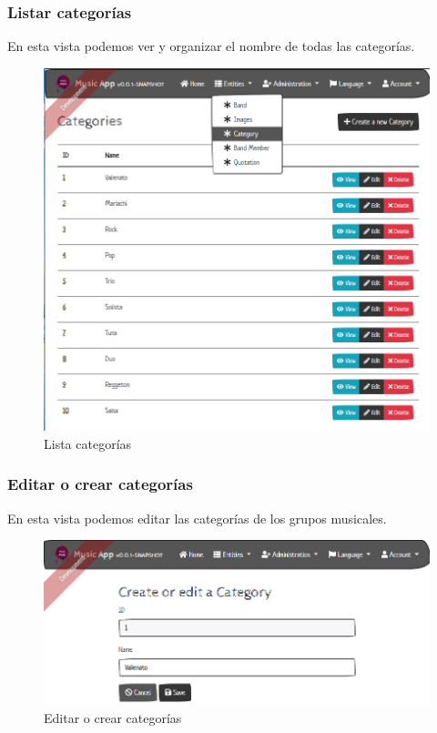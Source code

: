 \subsubsection{Listar categorías}
En esta vista podemos ver y organizar el nombre de todas las categorías.
\begin{figure}[h!]
 \centering
\includegraphics[width=\linewidth]{Desarrollo/Interfaces/Interfaces/imgs/categoryList.PNG}
\caption{Lista categorías}
\end{figure}

\newpage

\subsubsection{Editar o crear categorías}
En esta vista podemos editar las categorías de los grupos musicales.
\begin{figure}[h!]
 \centering
\includegraphics[width=0.8\linewidth]{Desarrollo/Interfaces/Interfaces/imgs/categoryEdit.PNG}
\caption{Editar o crear categorías}
\end{figure}

